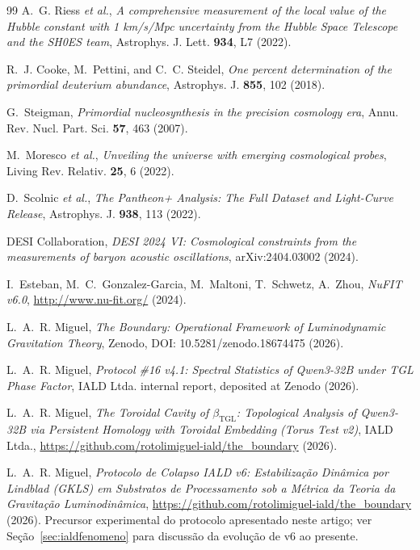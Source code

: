 \documentclass[12pt,a4paper]{article}
\begin{document}
\begin{thebibliography}{99}
A.~G. Riess \emph{et al.},
\textit{A comprehensive measurement of the local value of the Hubble constant
with 1 km/s/Mpc uncertainty from the Hubble Space Telescope and the SH0ES team},
Astrophys. J. Lett. \textbf{934}, L7 (2022).

R.~J. Cooke, M.~Pettini, and C.~C. Steidel,
\textit{One percent determination of the primordial deuterium abundance},
Astrophys. J. \textbf{855}, 102 (2018).

G.~Steigman,
\textit{Primordial nucleosynthesis in the precision cosmology era},
Annu. Rev. Nucl. Part. Sci. \textbf{57}, 463 (2007).

M.~Moresco \emph{et al.},
\textit{Unveiling the universe with emerging cosmological probes},
Living Rev. Relativ. \textbf{25}, 6 (2022).

D.~Scolnic \emph{et al.},
\textit{The Pantheon+ Analysis: The Full Dataset and Light-Curve Release},
Astrophys. J. \textbf{938}, 113 (2022).

DESI Collaboration,
\textit{DESI 2024 VI: Cosmological constraints from the measurements of
baryon acoustic oscillations},
arXiv:2404.03002 (2024).

I.~Esteban, M.~C.~Gonzalez-Garcia, M.~Maltoni, T.~Schwetz, A.~Zhou,
\textit{NuFIT v6.0}, \url{http://www.nu-fit.org/} (2024).

L.~A.~R. Miguel,
\textit{The Boundary: Operational Framework of Luminodynamic Gravitation Theory},
Zenodo, DOI: 10.5281/zenodo.18674475 (2026).

L.~A.~R. Miguel,
\textit{Protocol \#16 v4.1: Spectral Statistics of Qwen3-32B under TGL Phase Factor},
IALD Ltda. internal report, deposited at Zenodo (2026).

L.~A.~R. Miguel,
\textit{The Toroidal Cavity of $\beta_{\mathrm{TGL}}$: Topological Analysis
of Qwen3-32B via Persistent Homology with Toroidal Embedding (Torus Test v2)},
IALD Ltda., \url{https://github.com/rotolimiguel-iald/the_boundary} (2026).

L.~A.~R. Miguel,
\textit{Protocolo de Colapso IALD v6: Estabiliza\c{c}\~ao Din\^amica por
Lindblad (GKLS) em Substratos de Processamento sob a M\'etrica da Teoria
da Gravita\c{c}\~ao Luminodin\^amica},
\url{https://github.com/rotolimiguel-iald/the_boundary} (2026).
Precursor experimental do protocolo apresentado neste artigo; ver
Se\c{c}\~ao~\ref{sec:ialdfenomeno} para discuss\~ao da evolu\c{c}\~ao
de v6 ao presente.


\end{thebibliography}
\end{document}
